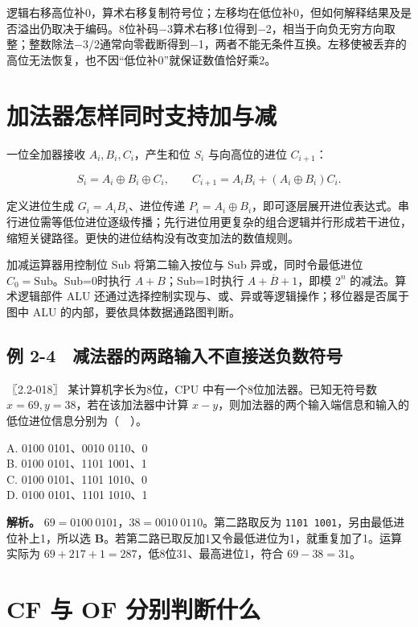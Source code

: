 逻辑右移高位补0，算术右移复制符号位；左移均在低位补0，但如何解释结果及是否溢出仍取决于编码。8位补码−3算术右移1位得到−2，相当于向负无穷方向取整；整数除法−3/2通常向零截断得到−1，两者不能无条件互换。左移使被丢弃的高位无法恢复，也不因``低位补0''就保证数值恰好乘2。

\section{加法器怎样同时支持加与减}\label{co-02-04}

一位全加器接收 \(A_i,B_i,C_i\)，产生和位 \(S_i\) 与向高位的进位 \(C_{i+1}\)：

\[
S_i=A_i\oplus B_i\oplus C_i,
\qquad C_{i+1}=A_iB_i+(A_i\oplus B_i)C_i.
\]

定义进位生成 \(G_i=A_iB_i\)、进位传递 \(P_i=A_i\oplus B_i\)，即可逐层展开进位表达式。串行进位需等低位进位逐级传播；先行进位用更复杂的组合逻辑并行形成若干进位，缩短关键路径。更快的进位结构没有改变加法的数值规则。

加减运算器用控制位 Sub 将第二输入按位与 Sub 异或，同时令最低进位 \(C_0=\mathrm{Sub}\)。Sub=0时执行 \(A+B\)；Sub=1时执行 \(A+\overline B+1\)，即模 \(2^n\) 的减法。算术逻辑部件 ALU 还通过选择控制实现与、或、异或等逻辑操作；移位器是否属于图中 ALU 的内部，要依具体数据通路图判断。

\subsection{例 2-4　减法器的两路输入不直接送负数符号}\label{co-ex2-4}

\noindent{}〖2.2-018〗 某计算机字长为8位，CPU 中有一个8位加法器。已知无符号数 \(x=69,y=38\)，若在该加法器中计算 \(x-y\)，则加法器的两个输入端信息和输入的低位进位信息分别为（　）。

A. 0100 0101、0010 0110、0\\
B. 0100 0101、1101 1001、1\\
C. 0100 0101、1101 1010、0\\
D. 0100 0101、1101 1010、1


\textbf{解析。} \(69=0100\ 0101\)，\(38=0010\ 0110\)。第二路取反为 \allowbreak{}\texttt{1101\ 1001}，另由最低进位补上1，所以选 \textbf{B}。若第二路已取反加1又令最低进位为1，就重复加了1。运算实际为 \(69+217+1=287\)，低8位31、最高进位1，符合 \(69-38=31\)。

\section{CF 与 OF 分别判断什么}\label{co-02-05}

